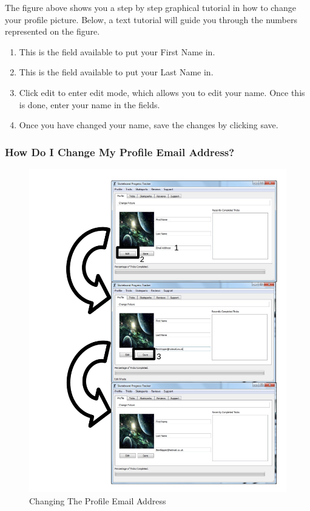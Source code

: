 The figure above shows you a step by step graphical tutorial in how to change your profile picture. Below, a text tutorial will guide you through the numbers represented on the figure.

\begin{enumerate}
\item This is the field available to put your First Name in.
\item This is the field available to put your Last Name in.
\item Click edit to enter edit mode, which allows you to edit your name. Once this is done, enter your name in the fields.
\item Once you have changed your name, save the changes by clicking save.
\end{enumerate}

\subsubsection{How Do I Change My Profile Email Address?}

\begin{figure}[H]
    \includegraphics[width=\textwidth]{./Manual/Images/ChangeEmail.pdf}
    \caption{Changing The Profile Email Address} \label{fig:Change Email}
\end{figure}

